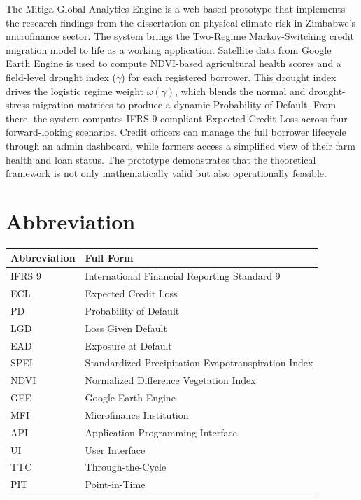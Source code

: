 \documentclass[12pt,a4paper]{article}
\begin{document}
The Mitiga Global Analytics Engine is a web-based prototype that implements the research findings from the dissertation on physical climate risk in Zimbabwe's microfinance sector. The system brings the Two-Regime Markov-Switching credit migration model to life as a working application. Satellite data from Google Earth Engine is used to compute NDVI-based agricultural health scores and a field-level drought index ($\gamma$) for each registered borrower. This drought index drives the logistic regime weight $\omega(\gamma)$, which blends the normal and drought-stress migration matrices to produce a dynamic Probability of Default. From there, the system computes IFRS 9-compliant Expected Credit Loss across four forward-looking scenarios. Credit officers can manage the full borrower lifecycle through an admin dashboard, while farmers access a simplified view of their farm health and loan status. The prototype demonstrates that the theoretical framework is not only mathematically valid but also operationally feasible.

\newpage

{}
\section*{Abbreviation}

\begin{center}
\begin{tabular}{|p{3.5cm}|p{9cm}|}
\hline
\textbf{Abbreviation} & \textbf{Full Form} \\
\hline
IFRS 9   & International Financial Reporting Standard 9 \\
\hline
ECL      & Expected Credit Loss \\
\hline
PD       & Probability of Default \\
\hline
LGD      & Loss Given Default \\
\hline
EAD      & Exposure at Default \\
\hline
SPEI     & Standardized Precipitation Evapotranspiration Index \\
\hline
NDVI     & Normalized Difference Vegetation Index \\
\hline
GEE      & Google Earth Engine \\
\hline
MFI      & Microfinance Institution \\
\hline
API      & Application Programming Interface \\
\hline
UI       & User Interface \\
\hline
TTC      & Through-the-Cycle \\
\hline
PIT      & Point-in-Time \\
\hline
\end{tabular}
\end{center}
\end{document}
